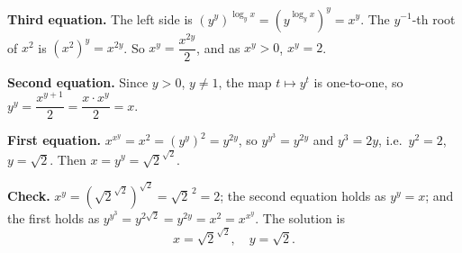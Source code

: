 \textbf{Third equation.} The left side is $\left(y^y\right)^{\log_yx}=\left(y^{\log_yx}\right)^y=x^y$. The $y^{-1}$-th root of $x^2$ is $\left(x^2\right)^{y}=x^{2y}$. So $x^y=\dfrac{x^{2y}}{2}$, and as $x^y>0$, $x^y=2$.

\textbf{Second equation.} Since $y>0$, $y\ne1$, the map $t\mapsto y^t$ is one-to-one, so $y^y=\dfrac{x^{y+1}}{2}=\dfrac{x\cdot x^y}{2}=x$.

\textbf{First equation.} $x^{x^y}=x^2=\left(y^y\right)^2=y^{2y}$, so $y^{y^3}=y^{2y}$ and $y^3=2y$, i.e.\ $y^2=2$, $y=\sqrt2$. Then $x=y^y=\sqrt2^{\sqrt2}$.

\textbf{Check.} $x^y=\left(\sqrt2^{\sqrt2}\right)^{\sqrt2}=\sqrt2^{\,2}=2$; the second equation holds as $y^y=x$; and the first holds as $y^{y^3}=y^{2\sqrt2}=y^{2y}=x^2=x^{x^y}$. The solution is
\[
\boxed{x=\sqrt2^{\sqrt2},\quad y=\sqrt2}.
\]
